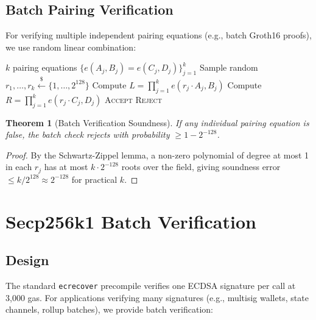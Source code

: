 \documentclass[11pt,a4paper]{article}
\newtheorem{theorem}{Theorem}
\begin{document}
\subsection{Batch Pairing Verification}

For verifying multiple independent pairing equations (e.g., batch Groth16 proofs), we use random linear combination:

\begin{algorithm}[H]
\caption{Batch Pairing Verification}
\label{alg:batch_pairing}
\begin{algorithmic}[1]
\Require $k$ pairing equations $\{e(A_j, B_j) = e(C_j, D_j)\}_{j=1}^k$
\State Sample random $r_1, \ldots, r_k \xleftarrow{\$} \{1, \ldots, 2^{128}\}$
\State Compute $L = \prod_{j=1}^k e(r_j \cdot A_j, B_j)$
\State Compute $R = \prod_{j=1}^k e(r_j \cdot C_j, D_j)$
    \State \Return \textsc{Accept}
\Else
    \State \Return \textsc{Reject}
\EndIf
\end{algorithmic}
\end{algorithm}

\begin{theorem}[Batch Verification Soundness]
If any individual pairing equation is false, the batch check rejects with probability $\geq 1 - 2^{-128}$.
\end{theorem}

\begin{proof}
By the Schwartz-Zippel lemma, a non-zero polynomial of degree at most 1 in each $r_j$ has at most $k \cdot 2^{-128}$ roots over the field, giving soundness error $\leq k / 2^{128} \approx 2^{-128}$ for practical $k$.
\end{proof}

\section{Secp256k1 Batch Verification}\label{sec:batch}

\subsection{Design}

The standard \texttt{ecrecover} precompile verifies one ECDSA signature per call at 3,000 gas. For applications verifying many signatures (e.g., multisig wallets, state channels, rollup batches), we provide batch verification:
\end{document}
